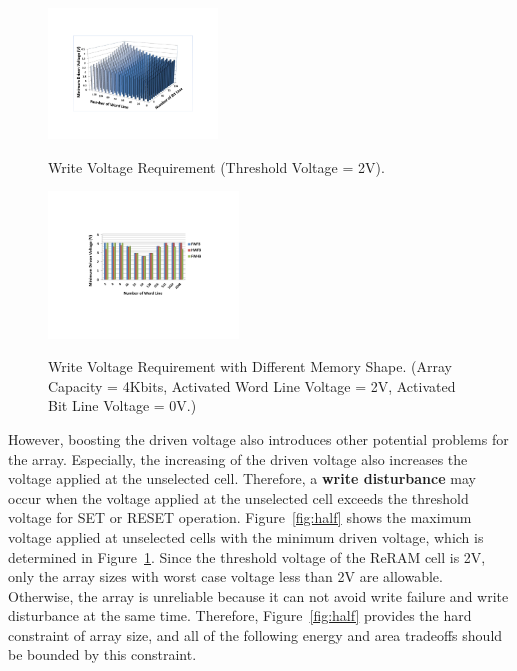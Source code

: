 
\begin{figure}%
\centering
  \includegraphics[width=0.4\textwidth]{./figures/worst_v3.pdf}\\
  \caption{Write Voltage Requirement (Threshold Voltage = 2V). }\label{fig:worst_v}
  \vspace{-10pt}
\end{figure}


\begin{figure}%
\centering
  \includegraphics[width=0.45\textwidth]{./figures/shape3.pdf}\\
  \caption{Write Voltage Requirement with Different Memory Shape. (Array Capacity = 4Kbits, Activated Word Line Voltage = 2V, Activated Bit Line Voltage = 0V.)}\label{fig:shape}
\end{figure}

However, boosting the driven voltage also introduces other potential problems for the array. Especially, the increasing of the driven voltage also increases the voltage applied at the unselected cell. Therefore, a
\textbf{write disturbance} may occur when the voltage applied at the
unselected cell exceeds the threshold voltage for SET or RESET operation. Figure~\ref{fig:half} shows the maximum voltage applied at
unselected cells with the minimum driven voltage, which is determined in
Figure~\ref{fig:worst_v}. Since the threshold voltage of the ReRAM cell is 2V, only the array sizes with worst case voltage less than 2V are allowable. Otherwise, the array is unreliable because it can not avoid write failure and write disturbance at the same time. Therefore, Figure~\ref{fig:half} provides the hard constraint of array size, and all of the following energy and area tradeoffs should be bounded by this constraint.

